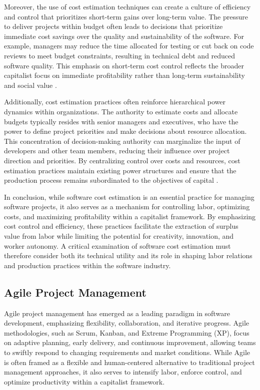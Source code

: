 \begin{refsection}
Moreover, the use of cost estimation techniques can create a culture of efficiency and control that prioritizes short-term gains over long-term value. The pressure to deliver projects within budget often leads to decisions that prioritize immediate cost savings over the quality and sustainability of the software. For example, managers may reduce the time allocated for testing or cut back on code reviews to meet budget constraints, resulting in technical debt and reduced software quality. This emphasis on short-term cost control reflects the broader capitalist focus on immediate profitability rather than long-term sustainability and social value \cite[pp.~143-145]{McConnell2006SoftwareEstimation}.

Additionally, cost estimation practices often reinforce hierarchical power dynamics within organizations. The authority to estimate costs and allocate budgets typically resides with senior managers and executives, who have the power to define project priorities and make decisions about resource allocation. This concentration of decision-making authority can marginalize the input of developers and other team members, reducing their influence over project direction and priorities. By centralizing control over costs and resources, cost estimation practices maintain existing power structures and ensure that the production process remains subordinated to the objectives of capital \cite[pp.~112-115]{Taylor2009ScientificManagement}.

In conclusion, while software cost estimation is an essential practice for managing software projects, it also serves as a mechanism for controlling labor, optimizing costs, and maximizing profitability within a capitalist framework. By emphasizing cost control and efficiency, these practices facilitate the extraction of surplus value from labor while limiting the potential for creativity, innovation, and worker autonomy. A critical examination of software cost estimation must therefore consider both its technical utility and its role in shaping labor relations and production practices within the software industry.

\subsection{Agile Project Management}

Agile project management has emerged as a leading paradigm in software development, emphasizing flexibility, collaboration, and iterative progress. Agile methodologies, such as Scrum, Kanban, and Extreme Programming (XP), focus on adaptive planning, early delivery, and continuous improvement, allowing teams to swiftly respond to changing requirements and market conditions. While Agile is often framed as a flexible and human-centered alternative to traditional project management approaches, it also serves to intensify labor, enforce control, and optimize productivity within a capitalist framework.


\end{refsection}
